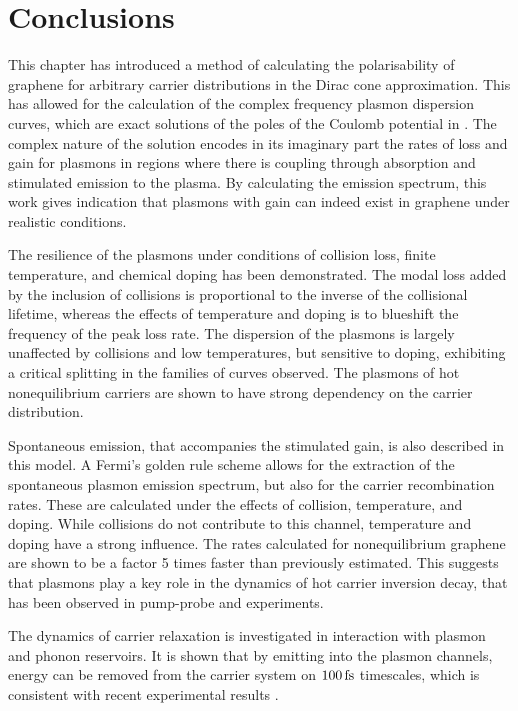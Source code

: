 \section{Conclusions}
This chapter has introduced a method of calculating the polarisability of
graphene for arbitrary carrier distributions in the Dirac cone approximation.
This has allowed for the calculation of the complex frequency plasmon dispersion
curves, which are exact solutions of the poles of the Coulomb potential in \rpa.
The complex nature of the solution encodes in its imaginary part the rates of
loss and gain for plasmons in regions where there is coupling through
absorption and stimulated emission to the \mdf plasma.
By calculating the emission spectrum, this work gives
indication that plasmons with gain can indeed exist in graphene under realistic
conditions.

The resilience of the plasmons under conditions of collision loss, finite
temperature, and chemical doping has been demonstrated.
The modal loss added by the inclusion of collisions is proportional to the
inverse of the collisional lifetime, whereas the effects of temperature and
doping is to blueshift the frequency of the peak loss rate.
The dispersion of the plasmons is largely unaffected by collisions and low
temperatures, but sensitive to doping, exhibiting a critical splitting in the
families of curves observed.
The plasmons of hot nonequilibrium carriers are shown to have strong dependency
on the carrier distribution.

Spontaneous emission, that accompanies the stimulated gain, is also described in
this model.
A Fermi's golden rule scheme allows for the extraction of the spontaneous
plasmon emission spectrum, but also for the carrier recombination rates.
These are calculated under the effects of collision, temperature, and
doping.
While collisions do not contribute to this channel, temperature and doping have
a strong influence.
The rates calculated for nonequilibrium graphene are shown to be a factor 5
times faster than previously estimated.
This suggests that plasmons play a key role in the dynamics of hot carrier
inversion decay, that has been observed in pump-probe and \trarpes experiments.

The dynamics of carrier relaxation is investigated in interaction with plasmon
and phonon reservoirs.
It is shown that by emitting into the plasmon channels, energy can be removed
from the carrier system on $100\operatorname{fs}$ timescales, which is consistent with recent
experimental results \cite{Breusing2011,Li2012}.
